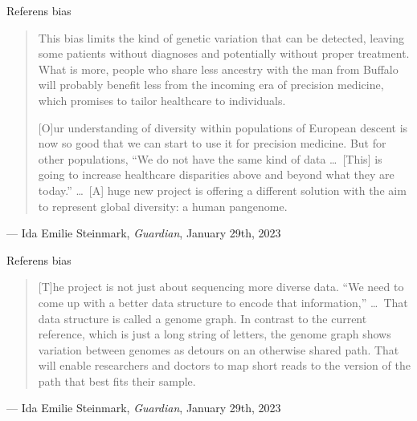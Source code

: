 \documentclass[11pt, aspectratio=169, table]{beamer}
\begin{document}
\begin{frame}{Referens bias}
\small
\begin{quotation}
This bias limits the kind of genetic variation that can be detected, leaving some patients without diagnoses and 
potentially without proper treatment. What is more, people who share less ancestry with the man from Buffalo will 
probably benefit less from the incoming era of precision medicine, which promises to tailor healthcare to individuals.

[O]ur understanding of diversity within populations of European descent is now so good that we can start to use it 
for precision medicine. But for other populations, ``We do not have the same kind of data \dots\ [This] is going to 
increase healthcare disparities above and beyond what they are today.'' \dots\ [A] huge new project is offering a 
different solution with the aim to represent global diversity: a human pangenome.
\end{quotation}

\hfill --- Ida Emilie Steinmark, {\it Guardian}, January 29th, 2023
\end{frame}

\begin{frame}{Referens bias}
\small
\begin{quotation}
[T]he project is not just about sequencing more diverse data. ``We need to come up with a better data structure to 
encode that information,'' \dots\ That data structure is called a genome graph. In contrast to the current reference, 
which is just a long string of letters, the genome graph shows variation between genomes as detours on an otherwise 
shared path. That will enable researchers and doctors to map short reads to the version of the path that best fits their sample.
\end{quotation}

\hfill --- Ida Emilie Steinmark, {\it Guardian}, January 29th, 2023
\end{frame}
\end{document}
